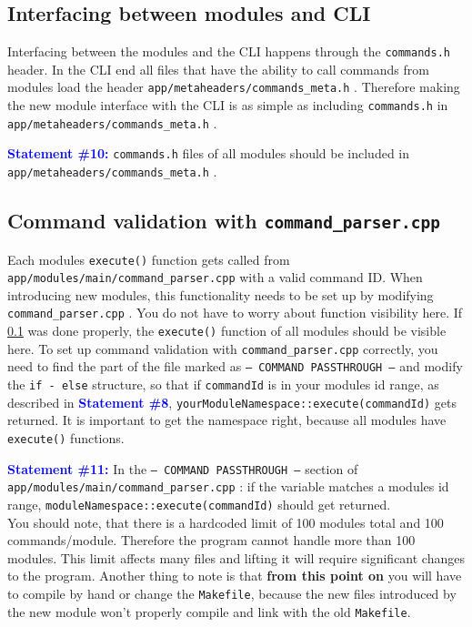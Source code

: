 \documentclass{article}
\newcommand{\statement}[1]{\par\medskip
  \textcolor{blue}{\textbf{#1:}}\space
}
\begin{document}
\subsection{Interfacing between modules and CLI}\label{interfacing}
Interfacing between the modules and the CLI happens through the 
\texttt{commands.h} header. In the CLI end all files that have the ability to 
call commands from modules load the header 
\texttt{app/metaheaders/commands\_meta.h} . Therefore making the new module 
interface with the CLI is as simple as including \texttt{commands.h} in 
\texttt{app/metaheaders/commands\_meta.h} .

\statement{Statement \#10} \texttt{commands.h} files of all modules should be 
included in \texttt{app/metaheaders/commands\_meta.h} .\\

\subsection{Command validation with \texttt{command\_parser.cpp}}\label{compar}
Each modules \texttt{execute()} function gets called from 
\texttt{app/modules/main/command\_parser.cpp} with a valid command ID. 
When introducing new modules, this functionality needs to be set up by 
modifying \texttt{command\_parser.cpp} . You do not have to worry about 
function visibility here. If \ref{interfacing} was done properly, the 
\texttt{execute()} function of all modules should be visible here. To set up 
command validation with \texttt{command\_parser.cpp} correctly, you need to 
find the part of the file marked as \texttt{--- COMMAND PASSTHROUGH ---} and 
modify the \texttt{if - else} structure, so that if \texttt{commandId} is in 
your modules id range, as described in 
\textcolor{blue}{\textbf{Statement \#8}}, 
\texttt{yourModuleNamespace::execute(commandId)} gets returned. It is 
important to get the namespace right, because all modules have 
\texttt{execute()} functions.

\statement{Statement \#11} In the \texttt{--- COMMAND PASSTHROUGH ---} section 
of \\ \texttt{app/modules/main/command\_parser.cpp} : if the  
variable matches a modules id range, 
\texttt{moduleNamespace::execute(commandId)} should get returned. \\

You should note, that there is a hardcoded limit of 100 modules total and 100 
commands/module. Therefore the program cannot handle more than 100 modules. 
This limit affects many files and lifting it will require significant 
changes to the program. Another thing to note is that \textbf{from this point 
on} you will have to compile by hand or change the \texttt{Makefile}, because 
the new files introduced by the new module won't properly compile and link 
with the old \texttt{Makefile}.
\end{document}

